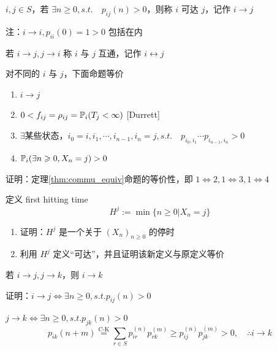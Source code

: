 \begin{definition}[可达]
    $i,j\in S$，若 $\exists n\geq 0, s.t.\quad p_{ij}(n)>0$，则称 $i$ 可达 $j$，记作 $i\to j$

    注：$i\to i,p_{ii}(0)=1>0$ 包括在内
\end{definition}

\begin{definition}[互通]
    若 $i\to j,j\to i$ 称 $i$ 与 $j$ 互通，记作 $i\leftrightarrow j$
\end{definition}

\begin{theorem}\label{thm:commu_equiv}
    对不同的 $i$ 与 $j$，下面命题等价
    \begin{enumerate}
        \item $i\to j$
        \item $0<f_{ij}=\rho_{ij}=\mathbb{P}_i(T_j<\infty)$ [Durrett\cite{durrett}]
        \item $\exists$某些状态，$i_0=i,i_1,\cdots,i_{n-1},i_n=j,s.t.\quad p_{i_0,i_1}\cdots p_{i_{n-1},i_n}>0$
        \item $\mathbb{P}_i(\exists n\geqslant 0,X_n=j)>0$
    \end{enumerate}
\end{theorem}

\begin{problem}[作业6-1]
    证明：定理\ref{thm:commu_equiv}命题的等价性，即 $1\Leftrightarrow 2,1\Leftrightarrow 3, 1\Leftrightarrow 4$
\end{problem}

\begin{problem}[作业6-2]
    定义 first hitting time
    \[
    H^j:=\min\{n\geq 0|X_n=j\}
    \]
    \begin{enumerate}
        \item 证明：$H^j$ 是一个关于 $(X_n)_{n\geq 0}$ 的停时
        \item 利用 $H^j$ 定义“可达”，并且证明该新定义与原定义等价
    \end{enumerate}
\end{problem}

\begin{property}
    若 $i\to j,j\to k$，则 $i\to k$
\end{property}

证明：$i\to j\Leftrightarrow\exists n\geq 0,s.t. p_{ij}(n)>0$

$j\to k\Leftrightarrow\exists n\geq 0,s.t. p_{jk}(n)>0$
\[
p_{ik}(n+m)\overset{\text{C-K}}{=}\sum_{r\in S}p_{ir}^{(n)}p_{rk}^{(m)}\geq p_{ij}^{(n)}p_{jk}^{(m)}>0,\quad \therefore i\to k
\]

